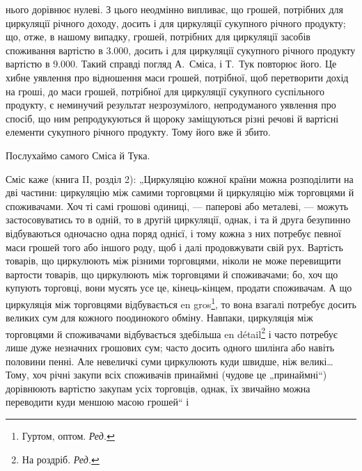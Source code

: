 \parcont{}  %
нього дорівнює нулеві. З цього неодмінно випливає, що грошей, потрібних
для циркуляції річного доходу, досить і для циркуляції сукупного
річного продукту; що, отже, в нашому випадку, грошей, потрібних для
циркуляції засобів споживання вартістю в \num{3.000}, досить і для циркуляції
сукупного річного продукту вартістю в \num{9.000}. Такий справді погляд
А.~Сміса, і Т.~Тук повторює його. Це хибне уявлення про відношення
маси грошей, потрібної, щоб перетворити дохід на гроші, до маси грошей,
потрібної для циркуляції сукупного суспільного продукту, є неминучий
результат незрозумілого, непродуманого уявлення про спосіб, що
ним репродукуються й щороку заміщуються різні речові й вартісні елементи
сукупного річного продукту. Тому його вже й збито.

Послухаймо самого Сміса й Тука.

Сміс каже (книга II, розділ 2): „Циркуляцію кожної країни можна
розподілити на дві частини: циркуляцію між самими торговцями й циркуляцію
між торговцями й споживачами. Хоч ті самі грошові одиниці, — паперові
або металеві, — можуть застосовуватись то в одній, то в другій
циркуляції, однак, і та й друга безупинно відбуваються одночасно одна поряд
однієї, і тому кожна з них потребує певної маси грошей того або
іншого роду, щоб і далі продовжувати свій рух. Вартість товарів, що циркулюють
між різними торговцями, ніколи не може перевищити вартости
товарів, що циркулюють між торговцями й споживачами; бо, хоч що купують
торговці, вони мусять усе це, кінець-кінцем, продати споживачам.
А що циркуляція між торговцями відбувається en gros\footnote*{
Гуртом, оптом. \emph{Ред.}
}, то вона взагалі потребує
досить великих сум для кожного поодинокого обміну. Навпаки, циркуляція
між торговцями й споживачами відбувається здебільша en détail\footnote*{
На роздріб. \emph{Ред.}
}
і часто потребує лише дуже незначних грошових сум; часто досить одного
шилінґа або навіть половини пенні. Але невеличкі суми циркулюють
куди швидше, ніж великі\dots{} Тому, хоч річні закупи всіх споживачів принаймні
(чудове це „принаймні“) дорівнюють вартістю закупам усіх
торговців, однак, їх звичайно можна переводити куди меншою масою
грошей“ і~

